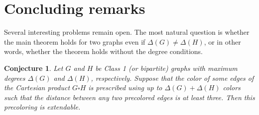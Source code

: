 \documentclass[a4paper,12pt]{article}
\newtheorem{conjecture}[theorem]{\bf Conjecture}
\begin{document}
 
 






\section{Concluding remarks}

Several interesting problems remain open. The most natural question is whether the main theorem holds for two graphs even if $\Delta(G) \neq \Delta(H)$, or in other words, whether the theorem holds without the degree conditions.

\begin{conjecture}
    Let $G$ and $H$ be Class 1 (or bipartite) graphs with maximum degrees $\Delta(G)$ and $\Delta(H)$, respectively. Suppose that the color of some edges of the Cartesian product $G \square H$ is prescribed using up to $\Delta(G) + \Delta(H)$ colors such that the distance between any two precolored edges is at least three. Then this precoloring is extendable.
\end{conjecture}
\end{document}
